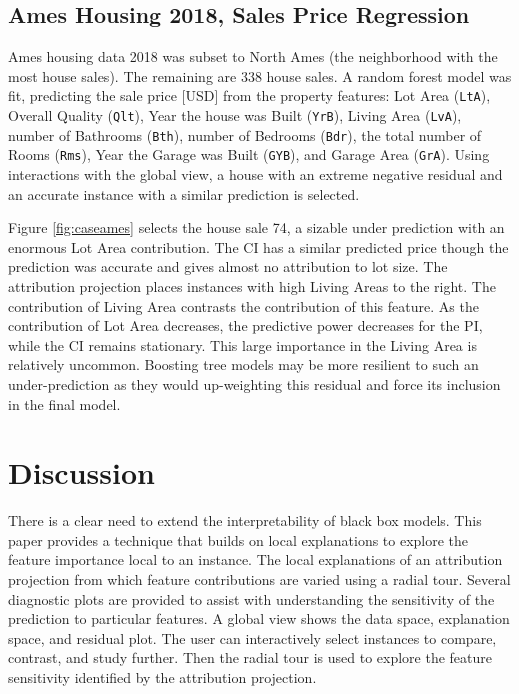 \documentclass[11pt,twoside]{article}
\begin{document}
\hypertarget{ames-housing-2018-sales-price-regression}{%
\subsection{Ames Housing 2018, Sales Price Regression}\label{ames-housing-2018-sales-price-regression}}

Ames housing data 2018 was subset to North Ames (the neighborhood with the most house sales). The remaining are 338 house sales. A random forest model was fit, predicting the sale price {[}USD{]} from the property features: Lot Area (\texttt{LtA}), Overall Quality (\texttt{Qlt}), Year the house was Built (\texttt{YrB}), Living Area (\texttt{LvA}), number of Bathrooms (\texttt{Bth}), number of Bedrooms (\texttt{Bdr}), the total number of Rooms (\texttt{Rms}), Year the Garage was Built (\texttt{GYB}), and Garage Area (\texttt{GrA}). Using interactions with the global view, a house with an extreme negative residual and an accurate instance with a similar prediction is selected.

Figure \ref{fig:caseames} selects the house sale 74, a sizable under prediction with an enormous Lot Area contribution. The CI has a similar predicted price though the prediction was accurate and gives almost no attribution to lot size. The attribution projection places instances with high Living Areas to the right. The contribution of Living Area contrasts the contribution of this feature. As the contribution of Lot Area decreases, the predictive power decreases for the PI, while the CI remains stationary. This large importance in the Living Area is relatively uncommon. Boosting tree models may be more resilient to such an under-prediction as they would up-weighting this residual and force its inclusion in the final model.

\hypertarget{sec:cheemdiscussion}{%
\section{Discussion}\label{sec:cheemdiscussion}}

There is a clear need to extend the interpretability of black box models. This paper provides a technique that builds on local explanations to explore the feature importance local to an instance. The local explanations of an attribution projection from which feature contributions are varied using a radial tour. Several diagnostic plots are provided to assist with understanding the sensitivity of the prediction to particular features. A global view shows the data space, explanation space, and residual plot. The user can interactively select instances to compare, contrast, and study further. Then the radial tour is used to explore the feature sensitivity identified by the attribution projection.
\end{document}
